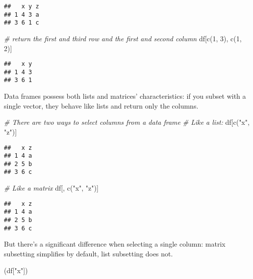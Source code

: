 \documentclass[
]{book}
\newenvironment{Shaded}{\begin{snugshade}}{\end{snugshade}}
\newcommand{\CommentTok}[1]{\textcolor[rgb]{0.56,0.35,0.01}{\textit{#1}}}
\newcommand{\DecValTok}[1]{\textcolor[rgb]{0.00,0.00,0.81}{#1}}
\newcommand{\FunctionTok}[1]{\textcolor[rgb]{0.00,0.00,0.00}{#1}}
\newcommand{\NormalTok}[1]{#1}
\newcommand{\StringTok}[1]{\textcolor[rgb]{0.31,0.60,0.02}{#1}}
\begin{document}
\begin{verbatim}
##   x y z
## 1 4 3 a
## 3 6 1 c
\end{verbatim}

\begin{Shaded}
\begin{Highlighting}[]
\CommentTok{\# return the first and third row and the first and second column}
\NormalTok{df[}\FunctionTok{c}\NormalTok{(}\DecValTok{1}\NormalTok{, }\DecValTok{3}\NormalTok{), }\FunctionTok{c}\NormalTok{(}\DecValTok{1}\NormalTok{, }\DecValTok{2}\NormalTok{)]}
\end{Highlighting}
\end{Shaded}

\begin{verbatim}
##   x y
## 1 4 3
## 3 6 1
\end{verbatim}

Data frames possess both lists and matrices' characteristics: if you subset with a single vector, they behave like lists and return only the columns.

\begin{Shaded}
\begin{Highlighting}[]
\CommentTok{\# There are two ways to select columns from a data frame}
\CommentTok{\# Like a list:}
\NormalTok{df[}\FunctionTok{c}\NormalTok{(}\StringTok{"x"}\NormalTok{, }\StringTok{"z"}\NormalTok{)]}
\end{Highlighting}
\end{Shaded}

\begin{verbatim}
##   x z
## 1 4 a
## 2 5 b
## 3 6 c
\end{verbatim}

\begin{Shaded}
\begin{Highlighting}[]
\CommentTok{\# Like a matrix}
\NormalTok{df[, }\FunctionTok{c}\NormalTok{(}\StringTok{"x"}\NormalTok{, }\StringTok{"z"}\NormalTok{)]}
\end{Highlighting}
\end{Shaded}

\begin{verbatim}
##   x z
## 1 4 a
## 2 5 b
## 3 6 c
\end{verbatim}

But there's a significant difference when selecting a single column: matrix subsetting simplifies by default, list subsetting does not.

\begin{Shaded}
\begin{Highlighting}[]
\NormalTok{(df[}\StringTok{"x"}\NormalTok{])}
\end{Highlighting}
\end{Shaded}
\end{document}
